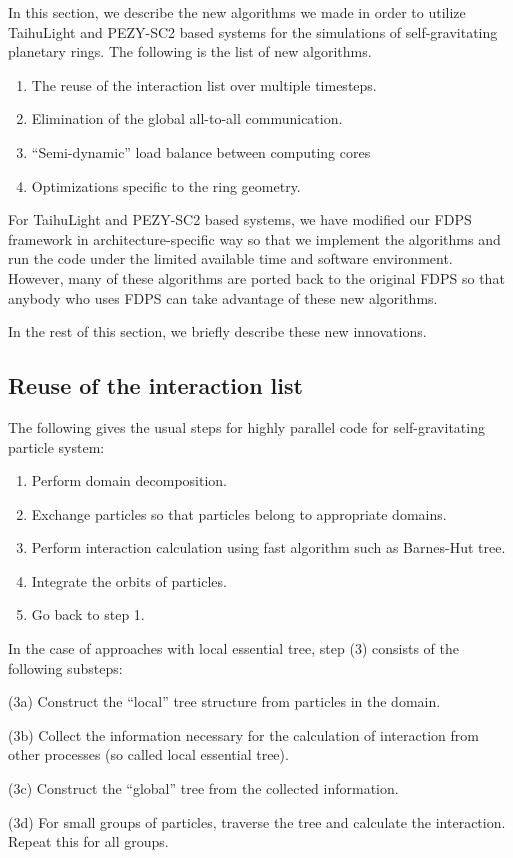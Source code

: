 \documentclass[Afour,sageh,times]{sagej}
\begin{document}
In this section, we describe the new algorithms we made in order to
utilize TaihuLight and PEZY-SC2 based systems for the simulations of
self-gravitating planetary rings. The following is the list of new
algorithms.


\begin{enumerate}
\item The reuse of the interaction list over multiple timesteps.
\item Elimination of  the global all-to-all communication.
\item ``Semi-dynamic'' load balance between computing cores
\item Optimizations specific to the ring geometry.
\end{enumerate}  

For TaihuLight and PEZY-SC2 based systems, we have modified our FDPS
framework in architecture-specific way so that we implement the
algorithms and run the code under the limited available time and
software environment. However, many of these algorithms are ported
back to the original FDPS so that anybody who uses FDPS can take
advantage of these new algorithms.

In the rest of this section, we briefly describe these new
innovations.

\subsection{Reuse of the interaction list}
\label{subsec:list}


The following gives the usual steps for highly parallel code for
self-gravitating particle system:

\begin{enumerate}

  \item Perform domain decomposition.
  \item Exchange particles so that particles belong to appropriate domains.
  \item Perform interaction calculation using fast algorithm such as
    Barnes-Hut tree.
  \item Integrate the orbits of particles.
  \item Go back to step 1.

\end{enumerate}

In the case of approaches with local essential tree, step (3) consists
of the following substeps:

\begin{description}

\item{(3a)} Construct the ``local'' tree structure from particles in
  the domain.
\item{(3b)} Collect the information necessary for the calculation of
  interaction from other processes (so called local essential tree).
\item{(3c)} Construct the ``global'' tree from the collected information.
\item{(3d)} For small groups of particles, traverse the tree and
  calculate the interaction. Repeat this for all groups.
\end{description}
\end{document}

